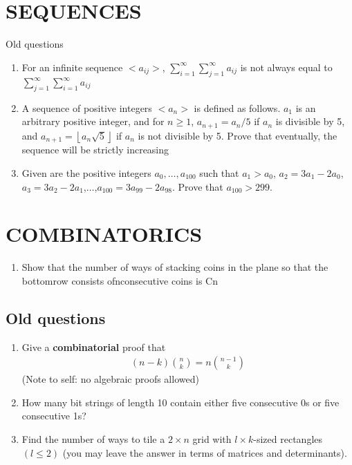 \documentclass[12pt]{article}
\newcommand{\floor}[1]{\left\lfloor #1 \right\rfloor}
\begin{document}
\section{SEQUENCES}
Old questions
\begin{enumerate}
    \item For an infinite sequence $<a_{ij}>$, $\displaystyle\sum_{i=1}^{\infty}\sum_{j=1}^{\infty} a_{ij}$ is not always equal to $\displaystyle\sum_{j=1}^{\infty}\sum_{i=1}^{\infty} a_{ij}$
    \item A sequence of positive integers $<a_{n}>$ is defined as follows. $a_{1}$ is an arbitrary positive integer, and for $n \ge 1$, $a_{n+1}=a_{n}/5$ if $a_{n}$ is divisible by 5, and $a_{n+1} = \floor{a_{n}\sqrt{5}}$ if $a_{n}$ is not divisible by 5. Prove that eventually, the sequence will be strictly increasing
    \item Given are the positive integers $a_{0},\dots,a_{100}$ such that $a_{1} > a_{0}$, $a_{2} = 3a_{1} - 2a_{0}$, $a_{3} = 3a_{2} - 2a_{1}$,$\dots$,$a_{100} = 3a_{99} - 2a_{98}$. Prove that $a_{100} > 299$.

\end{enumerate}

\section{COMBINATORICS}

    \begin{enumerate}
        \item Show that the number of ways of stacking coins in the plane so that the bottomrow consists ofnconsecutive coins is Cn


    \end{enumerate}

\subsection{Old questions}
\begin{enumerate}
    \item Give a \textbf{combinatorial} proof that 
    \begin{align*}
    (n-k)\binom{n}{k} = n\binom{n-1}{k}
    \end{align*}
    (Note to self: no algebraic proofs allowed)
    \item How many bit strings of length 10 contain either five consecutive 0s or five consecutive 1s?
    \item Find the number of ways to tile a $2 \times n$ grid with $l \times k$-sized rectangles $(l \leq 2)$ (you may leave the answer in terms of matrices and determinants).
\end{enumerate}
\end{document}

